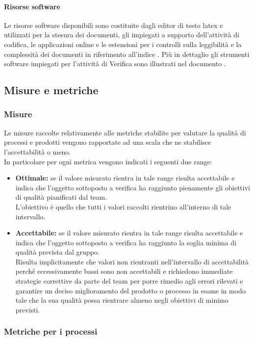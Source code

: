 			\paragraph{Risorse software}
			Le risorse software disponibili sono costituite dagli editor di testo latex e utilizzati per la stesura dei documenti, gli  impiegati a supporto dell'attività di codifica, le applicazioni online e le estensioni per i controlli sulla leggibilità e la complessità dei documenti in riferimento all'indice . Più in dettaglio gli strumenti software impiegati per l'attività di Verifica sono illustrati nel documento \NdP.
	\subsection{Misure e metriche \label{S5}}
		\subsubsection{Misure}
		Le misure raccolte relativamente alle metriche stabilite per valutare la qualità di processi e prodotti vengono rapportate ad una scala che ne stabilisce l'accettabilità o meno. \\In particolare per ogni metrica vengono indicati i seguenti due range:
			\begin{itemize}
			\item \textbf{Ottimale:} se il valore misurato rientra in tale range risulta accettabile e indica che l'oggetto sottoposto a verifica ha raggiunto pienamente gli obiettivi di qualità pianificati dal team. \\L'obiettivo è quello che tutti i valori raccolti rientrino all'interno di tale intervallo.
			\item \textbf{Accettabile:} se il valore misurato rientra in tale range risulta accettabile e indica che l'oggetto sottoposto a verifica ha raggiunto la soglia minima di qualità prevista dal gruppo.
\\Risulta implicitamente che valori non rientranti nell'intervallo di accettabilità perché eccessivamente bassi sono non accettabili e richiedono immediate strategie correttive da parte del team per porre rimedio agli errori rilevati e garantire un deciso miglioramento del prodotto o processo in esame in modo tale che la sua qualità possa rientrare almeno negli obiettivi di minimo previsti.		
			\end{itemize}
	

		\subsubsection{Metriche per i processi}
